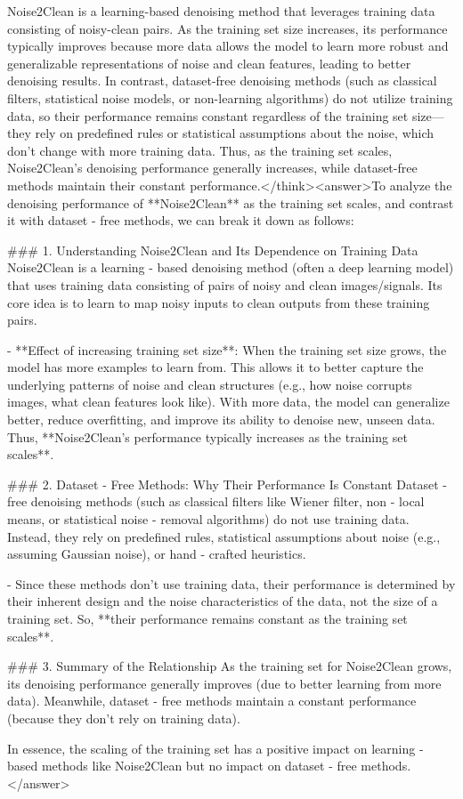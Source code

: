 Noise2Clean is a learning-based denoising method that leverages training data consisting of noisy-clean pairs. As the training set size increases, its performance typically improves because more data allows the model to learn more robust and generalizable representations of noise and clean features, leading to better denoising results. In contrast, dataset-free denoising methods (such as classical filters, statistical noise models, or non-learning algorithms) do not utilize training data, so their performance remains constant regardless of the training set size—they rely on predefined rules or statistical assumptions about the noise, which don't change with more training data. Thus, as the training set scales, Noise2Clean’s denoising performance generally increases, while dataset-free methods maintain their constant performance.</think><answer>To analyze the denoising performance of **Noise2Clean** as the training set scales, and contrast it with dataset - free methods, we can break it down as follows:  


### 1. Understanding Noise2Clean and Its Dependence on Training Data  
Noise2Clean is a learning - based denoising method (often a deep learning model) that uses training data consisting of pairs of noisy and clean images/signals. Its core idea is to learn to map noisy inputs to clean outputs from these training pairs.  

- **Effect of increasing training set size**: When the training set size grows, the model has more examples to learn from. This allows it to better capture the underlying patterns of noise and clean structures (e.g., how noise corrupts images, what clean features look like). With more data, the model can generalize better, reduce overfitting, and improve its ability to denoise new, unseen data. Thus, **Noise2Clean’s performance typically increases as the training set scales**.  


### 2. Dataset - Free Methods: Why Their Performance Is Constant  
Dataset - free denoising methods (such as classical filters like Wiener filter, non - local means, or statistical noise - removal algorithms) do not use training data. Instead, they rely on predefined rules, statistical assumptions about noise (e.g., assuming Gaussian noise), or hand - crafted heuristics.  

- Since these methods don’t use training data, their performance is determined by their inherent design and the noise characteristics of the data, not the size of a training set. So, **their performance remains constant as the training set scales**.  


### 3. Summary of the Relationship  
As the training set for Noise2Clean grows, its denoising performance generally improves (due to better learning from more data). Meanwhile, dataset - free methods maintain a constant performance (because they don’t rely on training data).  


In essence, the scaling of the training set has a positive impact on learning - based methods like Noise2Clean but no impact on dataset - free methods.</answer>